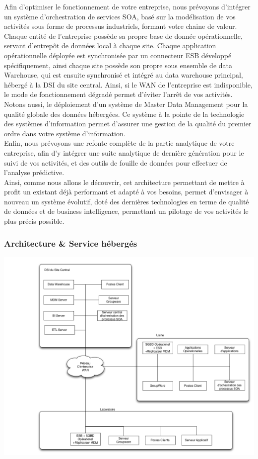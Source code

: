 Afin d'optimiser le fonctionnement de votre entreprise, nous prévoyons d'intégrer un système d'orchestration de services SOA, basé sur la modélisation de vos activités sous forme de processus industriels, formant votre chaine de valeur.\\
Chaque entité de l'entreprise possède sa propre base de donnée opérationnelle, servant d'entrepôt de données local à chaque site. Chaque application opérationnelle déployée est synchronisée par un connecteur ESB développé spécifiquement, ainsi chaque site possède son propre sous ensemble de data Warehouse, qui est ensuite synchronisé et intégré au data warehouse principal, hébergé à la DSI du site central. Ainsi, si le WAN de l'entreprise est indisponible, le mode de fonctionnement dégradé permet d'éviter l'arrêt de vos activités.\\
Notons aussi, le déploiement d'un système de Master Data Management pour la qualité globale des données hébergées. Ce système à la pointe de la technologie des systèmes d'information permet d'assurer une gestion de la qualité du premier ordre dans votre système d'information.\\
Enfin, nous prévoyons une refonte complète de la partie analytique de votre entreprise, afin d'y intégrer une suite analytique de dernière génération pour le suivi de vos activités, et des outils de fouille de données pour effectuer de l'analyse prédictive.\\

Ainsi, comme nous allons le découvrir, cet architecture permettant de mettre  à profit un existant déjà performant et adapté à vos besoins, permet d'envisager à nouveau un système évolutif, doté des dernières technologies en terme de qualité de données et de business intelligence, permettant un pilotage de vos activités le plus précis possible.\\

\subsubsection{Architecture \& Service hébergés}

\includegraphics[scale=0.2]{DiagrameSOAPdc4.png}

